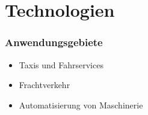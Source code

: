 \section{Technologien}

\begin{frame}
    \frametitle{Anwendungsgebiete}
    
    \begin{itemize}
        \item Taxis und Fahrservices
        \item Frachtverkehr
        \item Automatisierung von Maschinerie
    \end{itemize}
\end{frame}